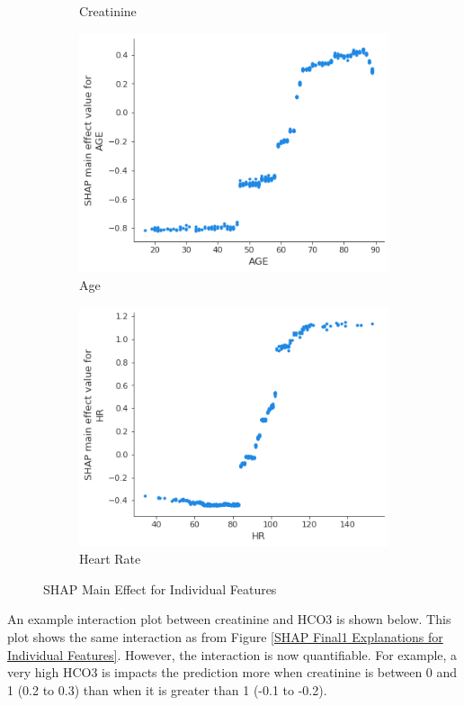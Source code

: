 \documentclass[12pt]{article}
\begin{document}
\begin{figure}[H]
\begin{subfigure}[b]{0.47\textwidth}
         \caption{Creatinine}
     \end{subfigure}
     \hfill
     \begin{subfigure}[b]{0.47\textwidth}
         \centering
         \includegraphics[width=\linewidth]{TreeExplainer Final1 Global/TreeExplainer Final1 Main Effect AGE.png}
         \caption{Age}
     \end{subfigure}
     \hfill
     \begin{subfigure}[b]{0.47\textwidth}
         \centering
         \includegraphics[width=\linewidth]{TreeExplainer Final1 Global/TreeExplainer Final1 Main Effect HR.png}
         \caption{Heart Rate}
     \end{subfigure}
     \caption{SHAP Main Effect for Individual Features}
\end{figure}
An example interaction plot between creatinine and HCO3 is shown below. This plot shows the same interaction as from Figure \ref{SHAP Final1 Explanations for Individual Features}. However, the interaction is now quantifiable. For example, a very high HCO3 is impacts the prediction more when creatinine is between 0 and 1 (0.2 to 0.3) than when it is greater than 1 (-0.1 to -0.2).
\end{document}
